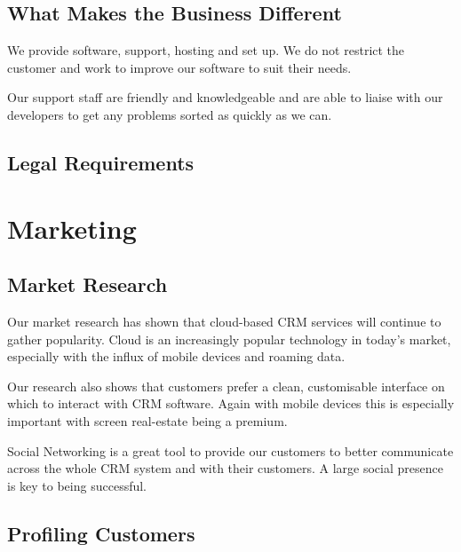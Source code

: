 \documentclass[DIV=calc, paper=a4, fontsize=11pt]{scrartcl}	 %
\begin{document}
\subsection{What Makes the Business Different}
We provide software, support, hosting and set up. We do not restrict the customer and work to 
improve our software to suit their needs.

Our support staff are friendly and knowledgeable and are able to liaise with our developers to get
any problems sorted as quickly as we can.




\subsection{Legal Requirements}


\section{Marketing}

\subsection{Market Research}
Our market research has shown that cloud-based CRM services will continue to gather popularity.
Cloud is an increasingly popular technology in today's market, especially with the influx of
mobile devices and roaming data.

Our research also shows that customers prefer a clean, customisable interface on which to interact
with CRM software. Again with mobile devices this is especially important with screen real-estate
being a premium.

Social Networking is a great tool to provide our customers to better communicate across the whole
CRM system and with their customers. A large social presence is key to being successful.

\subsection{Profiling Customers}
\end{document}
